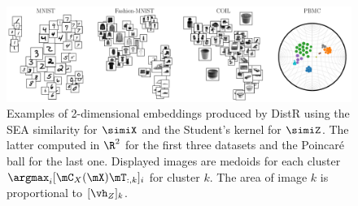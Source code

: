 \begin{figure}[t!]
	\begin{center}
		\centerline{\includegraphics[width=\columnwidth]{figures/DistR/DistDR_embed.pdf}}
		\caption{Examples of 2-dimensional embeddings produced by DistR using the SEA similarity for $\simiX$ 
		and the Student's kernel for $\simiZ$. The latter computed in $\R^2$ for the first three datasets and the Poincaré ball for the last one.
		Displayed images are medoids for each cluster \ie $\argmax_i [\mC_X(\mX)\mT_{:,k}]_i$ for cluster $k$. The area of image $k$ is proportional to $[\vh_Z]_k$.
		}
		\label{fig:visu_gwdr}
	\end{center}
	\vspace{-0.8cm}
\end{figure}


